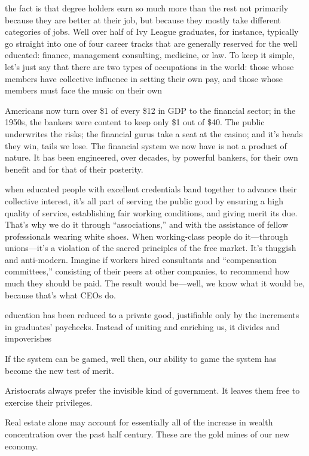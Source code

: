 \documentclass[
]{book}
\begin{document}
the fact is that degree holders earn so much more than the rest
not primarily because they are better at their job, but because they
mostly take different categories of jobs. Well over half of Ivy League
graduates, for instance, typically go straight into one of four career
tracks that are generally reserved for the well educated: finance,
management consulting, medicine, or law.
To keep it simple, let's just
say that there are two types of occupations in the world: those whose
members have collective influence in setting their own pay, and those
whose members must face the music on their own

Americans now turn over \$1 of
every \$12 in GDP to the financial sector; in the 1950s, the bankers
were content to keep only \$1 out of \$40.
The public underwrites the
risks; the financial gurus take a seat at the casino; and it's heads they
win, tails we lose. The financial system we now have is not a product
of nature. It has been engineered, over decades, by powerful bankers,
for their own benefit and for that of their posterity.

when educated people with excellent credentials band
together to advance their collective interest, it's all part of serving the
public good by ensuring a high quality of service, establishing fair
working conditions, and giving merit its due. That's why we do it
through ``associations,'' and with the assistance of fellow professionals
wearing white shoes. When working-class people do it---through
unions---it's a violation of the sacred principles of the free market. It's
thuggish and anti-modern. Imagine if workers hired consultants and
``compensation committees,'' consisting of their peers at other
companies, to recommend how much they should be paid. The result
would be---well, we know what it would be, because that's what
CEOs do.

education has been reduced to a private
good, justifiable only by the increments in graduates' paychecks.
Instead of uniting and enriching us, it divides and impoverishes

If the system can be gamed, well then, our ability to game
the system has become the new test of merit.

Aristocrats always prefer the invisible kind of
government. It leaves them free to exercise their privileges.

Real estate alone
may account for essentially all of the increase in wealth concentration
over the past half century.
These are the gold mines of our new economy.
\end{document}

